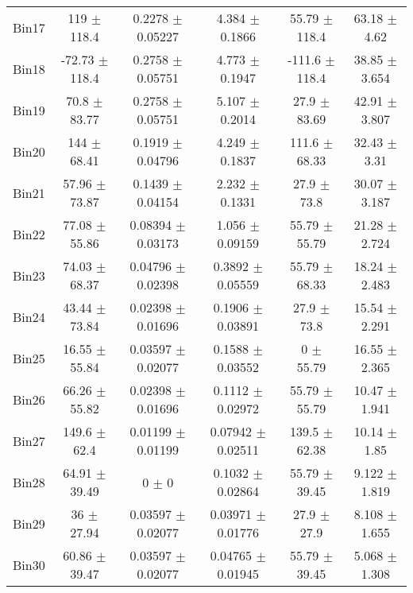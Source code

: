\begin{tabular}{@{\extracolsep{4pt}}lccccc@{}}
     Bin17 & 119 $\pm$ 118.4 & 0.2278 $\pm$ 0.05227 & 4.384 $\pm$ 0.1866 & 55.79 $\pm$ 118.4 & 63.18 $\pm$ 4.62 \\ 
     Bin18 & -72.73 $\pm$ 118.4 & 0.2758 $\pm$ 0.05751 & 4.773 $\pm$ 0.1947 & -111.6 $\pm$ 118.4 & 38.85 $\pm$ 3.654 \\ 
     Bin19 & 70.8 $\pm$ 83.77 & 0.2758 $\pm$ 0.05751 & 5.107 $\pm$ 0.2014 & 27.9 $\pm$ 83.69 & 42.91 $\pm$ 3.807 \\ 
     Bin20 & 144 $\pm$ 68.41 & 0.1919 $\pm$ 0.04796 & 4.249 $\pm$ 0.1837 & 111.6 $\pm$ 68.33 & 32.43 $\pm$ 3.31 \\ 
     Bin21 & 57.96 $\pm$ 73.87 & 0.1439 $\pm$ 0.04154 & 2.232 $\pm$ 0.1331 & 27.9 $\pm$ 73.8 & 30.07 $\pm$ 3.187 \\ 
     Bin22 & 77.08 $\pm$ 55.86 & 0.08394 $\pm$ 0.03173 & 1.056 $\pm$ 0.09159 & 55.79 $\pm$ 55.79 & 21.28 $\pm$ 2.724 \\ 
     Bin23 & 74.03 $\pm$ 68.37 & 0.04796 $\pm$ 0.02398 & 0.3892 $\pm$ 0.05559 & 55.79 $\pm$ 68.33 & 18.24 $\pm$ 2.483 \\ 
     Bin24 & 43.44 $\pm$ 73.84 & 0.02398 $\pm$ 0.01696 & 0.1906 $\pm$ 0.03891 & 27.9 $\pm$ 73.8 & 15.54 $\pm$ 2.291 \\ 
     Bin25 & 16.55 $\pm$ 55.84 & 0.03597 $\pm$ 0.02077 & 0.1588 $\pm$ 0.03552 & 0 $\pm$ 55.79 & 16.55 $\pm$ 2.365 \\ 
     Bin26 & 66.26 $\pm$ 55.82 & 0.02398 $\pm$ 0.01696 & 0.1112 $\pm$ 0.02972 & 55.79 $\pm$ 55.79 & 10.47 $\pm$ 1.941 \\ 
     Bin27 & 149.6 $\pm$ 62.4 & 0.01199 $\pm$ 0.01199 & 0.07942 $\pm$ 0.02511 & 139.5 $\pm$ 62.38 & 10.14 $\pm$ 1.85 \\ 
     Bin28 & 64.91 $\pm$ 39.49 & 0 $\pm$ 0 & 0.1032 $\pm$ 0.02864 & 55.79 $\pm$ 39.45 & 9.122 $\pm$ 1.819 \\ 
     Bin29 & 36 $\pm$ 27.94 & 0.03597 $\pm$ 0.02077 & 0.03971 $\pm$ 0.01776 & 27.9 $\pm$ 27.9 & 8.108 $\pm$ 1.655 \\ 
     Bin30 & 60.86 $\pm$ 39.47 & 0.03597 $\pm$ 0.02077 & 0.04765 $\pm$ 0.01945 & 55.79 $\pm$ 39.45 & 5.068 $\pm$ 1.308 \\ 
\hline\hline
  \end{tabular}
